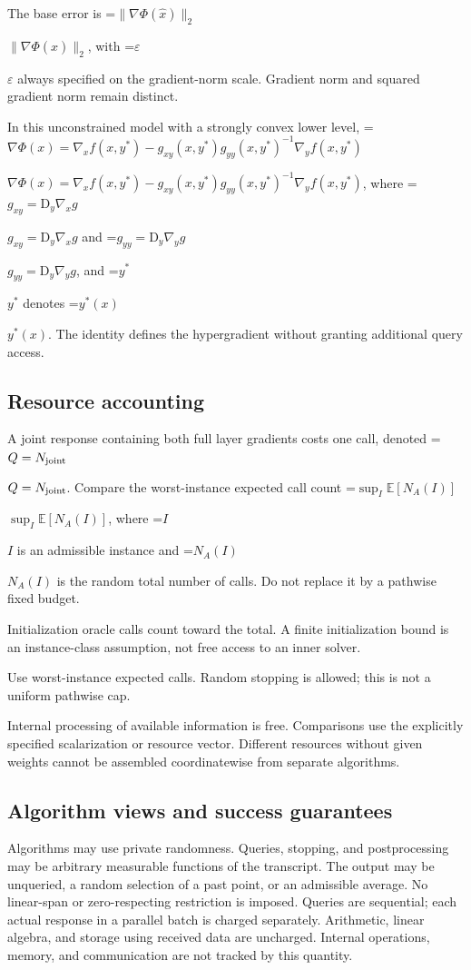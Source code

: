 \documentclass[10pt,a4paper]{article}
\newcommand{\AtlasMath}[1]{\par\begingroup\centering\setbox0=\hbox{$\displaystyle #1$}\ifdim\wd0>1.4\linewidth\typeout{ATLAS WIDE FORMULA: \the\wd0}\fi\ifdim\wd0>\linewidth\resizebox{\linewidth}{!}{\box0}\else\box0\fi\par\endgroup}
\newcommand{\AtlasInlineMath}[1]{\begingroup\setbox0=\hbox{$#1$}\ifdim\wd0>.4\linewidth\endgroup\AtlasMath{#1}\else\endgroup$#1$\fi}
\begin{document}
The base error is \AtlasInlineMath{\|\nabla\Phi(\widehat{x})\|_2}, with \AtlasInlineMath{\varepsilon} always specified on the gradient-norm scale. Gradient norm and squared gradient norm remain distinct.



In this unconstrained model with a strongly convex lower level, \AtlasInlineMath{\nabla\Phi(x)=\nabla_x f(x,y^*)-g_{xy}(x,y^*)g_{yy}(x,y^*)^{-1}\nabla_y f(x,y^*)}, where \AtlasInlineMath{g_{xy}=\mathrm{D}_y\nabla_x g} and \AtlasInlineMath{g_{yy}=\mathrm{D}_y\nabla_y g}, and \AtlasInlineMath{y^*} denotes \AtlasInlineMath{y^*(x)}. The identity defines the hypergradient without granting additional query access.



\subsection{Resource accounting}


A joint response containing both full layer gradients costs one call, denoted \AtlasInlineMath{Q=N_{\rm joint}}. Compare the worst-instance expected call count \AtlasInlineMath{\sup_{I}\mathbb{E}[N_A(I)]}, where \AtlasInlineMath{I} is an admissible instance and \AtlasInlineMath{N_A(I)} is the random total number of calls. Do not replace it by a pathwise fixed budget.



Initialization oracle calls count toward the total. A finite initialization bound is an instance-class assumption, not free access to an inner solver.



Use worst-instance expected calls. Random stopping is allowed; this is not a uniform pathwise cap.



Internal processing of available information is free. Comparisons use the explicitly specified scalarization or resource vector. Different resources without given weights cannot be assembled coordinatewise from separate algorithms.



\subsection{Algorithm views and success guarantees}


Algorithms may use private randomness. Queries, stopping, and postprocessing may be arbitrary measurable functions of the transcript. The output may be unqueried, a random selection of a past point, or an admissible average. No linear-span or zero-respecting restriction is imposed. Queries are sequential; each actual response in a parallel batch is charged separately. Arithmetic, linear algebra, and storage using received data are uncharged. Internal operations, memory, and communication are not tracked by this quantity.
\end{document}
